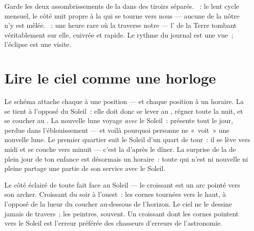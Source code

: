 \begin{example}\label{ex:g7:moon-phases:eclipsevs}
Garde les deux assombrissements de la  dans des tiroirs séparés.
\emph{}~: le lent cycle mensuel, le côté nuit propre à la 
qui se tourne vers nous --- aucune  de la nôtre n'y est mêlée.
\emph{}~: une heure rare où la  traverse
notre  --- l' de la Terre tombant véritablement sur
elle, cuivrée et rapide. Le rythme du journal est une vue~; l'éclipse
est une visite.
\end{example}

\section{Lire le ciel comme une horloge}

\begin{example}\label{ex:g7:moon-phases:hours}
Le schéma attache chaque  à une position --- et chaque position
à un horaire. La  se tient à l'opposé du Soleil~: elle
doit donc se lever au , régner toute la nuit, et se
coucher au . La nouvelle lune voyage \emph{avec} le
Soleil~: présente tout le jour, perdue dans l'éblouissement --- et
voilà pourquoi personne ne «~voit~» une nouvelle lune. Le premier
quartier suit le Soleil d'un quart de tour~: il se lève vers midi et
se couche vers minuit --- c'est la  d'après le dîner. La surprise
de la  de plein jour de ton enfance est désormais un horaire~:
toute  qui n'est ni nouvelle ni pleine partage une partie de son
service avec le Soleil.
\end{example}

\begin{example}\label{ex:g7:moon-phases:points}
Le côté éclairé de toute  fait face au Soleil --- le croissant
est un arc pointé vers son archer. Croissant du soir à l'ouest~: les
cornes tournées vers le haut, à l'opposé de la lueur du coucher
au-dessous de l'horizon. Le ciel ne le dessine jamais de travers~;
les peintres, souvent. Un croissant dont les cornes pointent vers le
Soleil est l'erreur préférée des chasseurs d'erreurs de
l'astronomie.
\end{example}

